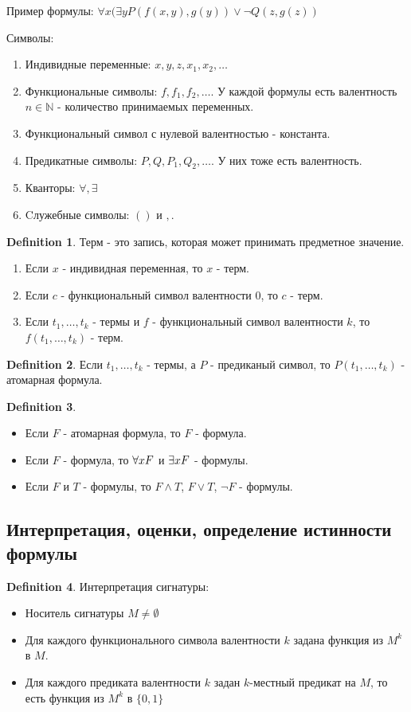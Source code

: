 \documentclass[a4paper]{article}
\theoremstyle{plain}
\theoremstyle{remark}
\theoremstyle{definition}
\newtheorem{definition}{Definition}
\newcommand{\forcenewline}{\ \newline}
\begin{document}
Пример формулы: $\forall{x} (\exists{y} P(f(x,y),g(y))\lor\lnot Q(z,g(z))$

Символы:
\begin{enumerate}
	\item Индивидные переменные: $x,y,z,x_1,x_2,\ldots$
	\item Функциональные символы: $f,f_1,f_2, \ldots$. У каждой формулы есть валентность $n \in \mathbb{N}$ - количество принимаемых переменных.
	\item Функциональный символ с нулевой валентностью - константа.
	\item Предикатные символы: $P,Q,P_1,Q_2, \ldots$. У них тоже есть валентность.
	\item Кванторы: $\forall, \exists$
	\item Cлужебные символы: $()$ и $,$.
\end{enumerate}

\begin{definition}
	Терм - это запись, которая может принимать предметное значение.
	\begin{enumerate}
		\item Если $x$ - индивидная переменная, то $x$ - терм.
		\item Если $c$ - функциональный символ валентности $0$, то $c$ - терм.
		\item Если $t_1, \ldots, t_k$ - термы и $f$ - функциональный символ валентности $k$, то $f(t_1, \ldots, t_k)$ - терм.
	\end{enumerate}
\end{definition}

\begin{definition}	
	Если $t_1, \ldots, t_k$ - термы, а $P$ - предиканый символ, то $P(t_1, \ldots, t_k)$ - атомарная формула.
\end{definition}

\begin{definition}
	\forcenewline
	\begin{itemize}
		\item Если $F$ - атомарная формула, то $F$ - формула.
		\item Если $F$ - формула, то $\forall x \space F$ и $\exists x \space F$ - формулы.
		\item Если $F$ и $T$ - формулы, то $F \land T$, $F \lor T$, $\lnot F$ - формулы.
	\end{itemize}
\end{definition}
\subsection{Интерпретация, оценки, определение истинности формулы}
\begin{definition}
	Интерпретация сигнатуры:
	\begin{itemize}
		\item Носитель сигнатуры $M \neq \emptyset$
		\item Для каждого функционального символа валентности $k$ задана функция из $M^k$ в $M$. 
		\item Для каждого предиката валентности $k$ задан $k$-местный предикат на $M$, то есть функция из $M^k$ в $\{0,1\}$
	\end{itemize}
\end{definition}
\end{document}

